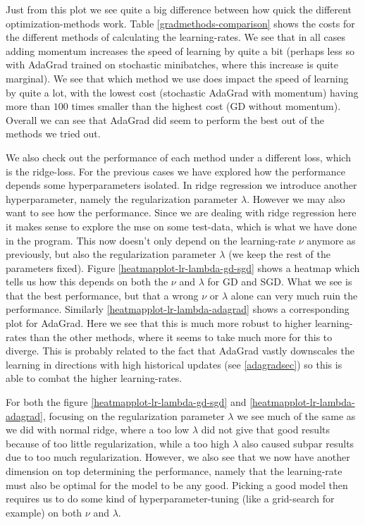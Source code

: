 \documentclass{article}
\begin{document}
Just from this plot we see quite a big difference between how quick the
different optimization-methods work. Table \ref{gradmethods-comparison} shows
the costs for the different methods of calculating the learning-rates. We see
that in all cases adding momentum increases the speed of learning by quite a
bit (perhaps less so with AdaGrad trained on stochastic minibatches, where this
increase is quite marginal). We see that which method we use does impact the
speed of learning by quite a lot, with the lowest cost (stochastic AdaGrad with
momentum) having more than $100$ times smaller than the highest cost (GD without
momentum). Overall we can see that AdaGrad did seem to perform the best out of
the methods we tried out.

We also check out the performance of each method under a different loss, which
is the ridge-loss. For the previous cases we have explored how the performance
depends some hyperparameters isolated. In ridge regression we introduce another
hyperparameter, namely the regularization parameter $\lambda$. However we may
also want to see how the performance. Since we are dealing with ridge regression
here it makes sense to explore the mse on some test-data, which is what we have
done in the program. This now doesn't only depend on the learning-rate $\nu$
anymore as previously, but also the regularization parameter $\lambda$ (we keep
the rest of the parameters fixed). Figure \ref{heatmapplot-lr-lambda-gd-sgd}
shows a heatmap which tells us how this depends on both the $\nu$ and $\lambda$
for GD and SGD.  What we see is that the best performance, but that a wrong
$\nu$ or $\lambda$ alone can very much ruin the performance. Similarly
\ref{heatmapplot-lr-lambda-adagrad} shows a corresponding plot for AdaGrad. Here
we see that this is much more robust to higher learning-rates than the other
methods, where it seems to take much more for this to diverge. This is probably
related to the fact that AdaGrad vastly downscales the learning in directions
with high historical updates (see \ref{adagradsec}) so this is able to combat
the higher learning-rates.

For both the figure \ref{heatmapplot-lr-lambda-gd-sgd} and
\ref{heatmapplot-lr-lambda-adagrad}, focusing on the regularization parameter
$\lambda$ we see much of the same as we did with normal ridge, where a too low
$\lambda$ did not give that good results because of too little regularization,
while a too high $\lambda$ also caused subpar results due to too much
regularization. However, we also see that we now have another dimension on top
determining the performance, namely that the learning-rate must also be optimal
for the model to be any good. Picking a good model then requires us to do some
kind of hyperparameter-tuning (like a grid-search for example) on both $\nu$ and
$\lambda$.
\end{document}
